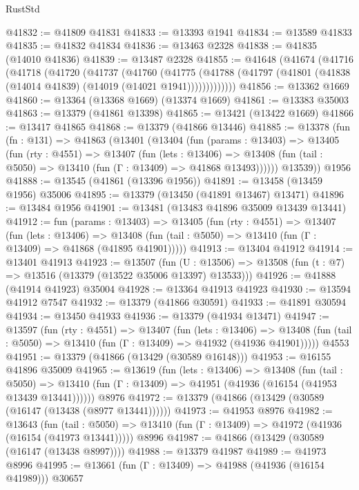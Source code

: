 \begin{lexlean}{RustStd}
\begin{coremodule}
@41832 := @41809 @41831
@41833 := @13393 @1941
@41834 := @13589 @41833
@41835 := @41832 @41834
@41836 := @13463 @2328
@41838 := @41835 (@14010 @41836)
@41839 := @13487 @2328
@41855 := @41648
    (@41674
      (@41716
        (@41718
          (@41720
            (@41737
              (@41760
                (@41775
                  (@41788 (@41797 (@41801 (@41838 (@14014 @41839) (@14019 (@14021 @1941)))))))))))))
@41856 := @13362 @1669
@41860 := @13364 (@13368 @1669) (@13374 @1669)
@41861 := @13383 @35003
@41863 := @13379 (@41861 @13398)
@41865 := @13421 (@13422 @1669)
@41866 := @13417 @41865
@41868 := @13379 (@41866 @13446)
@41885 := @13378
    (fun (fn : @131) =>
    @41863
      (@13401
        (@13404
          (fun (params : @13403) =>
          @13405
            (fun (rty : @4551) =>
            @13407
              (fun (lets : @13406) =>
              @13408 (fun (tail : @5050) => @13410 (fun (Γ : @13409) => @41868 @13493))))))
        @13539))
    @1956
@41888 := @13545 (@41861 (@13396 @1956))
@41891 := @13458 (@13459 @1956) @35006
@41895 := @13379 (@13450 (@41891 @13467) @13471)
@41896 := @13484 @1956
@41901 := @13481 (@13483 @41896 @35009 @13439 @13441)
@41912 := fun (params : @13403) =>
  @13405
    (fun (rty : @4551) =>
    @13407
      (fun (lets : @13406) =>
      @13408 (fun (tail : @5050) => @13410 (fun (Γ : @13409) => @41868 (@41895 @41901)))))
@41913 := @13404 @41912
@41914 := @13401 @41913
@41923 := @13507
    (fun (U : @13506) => @13508 (fun (t : @7) => @13516 (@13379 (@13522 @35006 @13397) @13533)))
@41926 := @41888 (@41914 @41923) @35004
@41928 := @13364 @41913 @41923
@41930 := @13594 @41912 @7547
@41932 := @13379 (@41866 @30591)
@41933 := @41891 @30594
@41934 := @13450 @41933
@41936 := @13379 (@41934 @13471)
@41947 := @13597
    (fun (rty : @4551) =>
    @13407
      (fun (lets : @13406) =>
      @13408 (fun (tail : @5050) => @13410 (fun (Γ : @13409) => @41932 (@41936 @41901)))))
    @4553
@41951 := @13379 (@41866 (@13429 (@30589 @16148)))
@41953 := @16155 @41896 @35009
@41965 := @13619
    (fun (lets : @13406) =>
    @13408
      (fun (tail : @5050) =>
      @13410 (fun (Γ : @13409) => @41951 (@41936 (@16154 (@41953 @13439 @13441))))))
    @8976
@41972 := @13379 (@41866 (@13429 (@30589 (@16147 (@13438 (@8977 @13441))))))
@41973 := @41953 @8976
@41982 := @13643
    (fun (tail : @5050) => @13410 (fun (Γ : @13409) => @41972 (@41936 (@16154 (@41973 @13441)))))
    @8996
@41987 := @41866 (@13429 (@30589 (@16147 (@13438 @8997))))
@41988 := @13379 @41987
@41989 := @41973 @8996
@41995 := @13661 (fun (Γ : @13409) => @41988 (@41936 (@16154 @41989))) @30657

\end{coremodule}
\end{lexlean}
